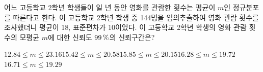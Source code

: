 어느 고등학교 2학년 학생들이 일 년 동안 영화를 관람한 횟수는 평균이 $m$인 정규분포를 따른다고 한다. 이 고등학교 2학년 학생 중 144명을 임의추출하여 영화 관람 횟수를 조사했더니 평균이 18, 표준편차가 10이었다. 이 고등학교 2학년 학생의 영화 관람 횟수의 모평균 $m$에 대한 신뢰도 $99\mkern3mu \%$의 신뢰구간은? 
\begin{choicesii}{$12.84\le m\le 23.16$}{$15.42\le m\le 20.58$}{$15.85\le m\le 20.15$}{$16.28\le m\le 19.72$}{$16.71\le m\le 19.29$}\end{choicesii}
